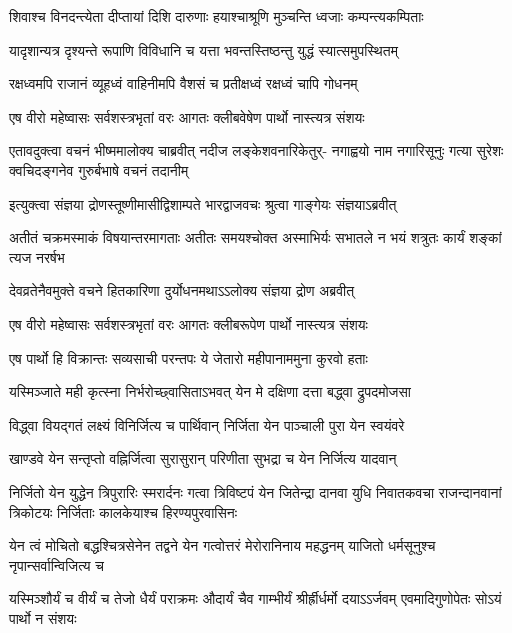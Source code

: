 \twolineshloka
{शिवाश्च विनदन्त्येता दीप्तायां दिशि दारुणाः}
{हयाश्चाश्रूणि मुञ्चन्ति ध्वजाः कम्पन्त्यकम्पिताः}


\twolineshloka
{यादृशान्यत्र दृश्यन्ते रूपाणि विविधानि च}
{यत्ता भवन्तस्तिष्ठन्तु युद्धं स्यात्समुपस्थितम्}


\twolineshloka
{रक्षध्वमपि राजानं व्यूहध्वं वाहिनीमपि}
{वैशसं च प्रतीक्षध्वं रक्षध्वं चापि गोधनम्}


\twolineshloka
{एष वीरो महेष्वासः सर्वशस्त्रभृतां वरः}
{आगतः क्लीबवेषेण पार्थो नास्त्यत्र संशयः}


\onelineshloka
{एतावदुक्त्वा वचनं भीष्ममालोक्य चाब्रवीत्}
\fourlineindentedshloka
{नदीज लङ्केशवनारिकेतुर्-}
{नगाह्वयो नाम नगारिसूनुः}
{गत्या सुरेशः क्वचिदङ्गनेव}
{गुरुर्बभाषे वचनं तदानीम्}



\twolineshloka
{इत्युक्त्वा संज्ञया द्रोणस्तूष्णीमासीद्विशाम्पते}
{भारद्वाजवचः श्रुत्वा गाङ्गेयः संज्ञयाऽब्रवीत्}


\threelineshloka
{अतीतं चक्रमस्माकं विषयान्तरमागताः}
{अतीतः समयश्चोक्त अस्माभिर्यः सभातले}
{न भयं शत्रुतः कार्यं शङ्कां त्यज नरर्षभ}


\twolineshloka
{देवव्रतेनैवमुक्ते वचने हितकारिणा}
{दुर्योधनमथाऽऽलोक्य संज्ञया द्रोण अब्रवीत्}


\twolineshloka
{एष वीरो महेष्वासः सर्वशस्त्रभृतां वरः}
{आगतः क्लीबरूपेण पार्थो नास्त्यत्र संशयः}


\twolineshloka
{एष पार्थो हि विक्रान्तः सव्यसाची परन्तपः}
{ये जेतारो महीपानाममुना कुरवो हताः}


\twolineshloka
{यस्मिञ्जाते मही कृत्स्ना निर्भरोच्छ्वासिताऽभवत्}
{येन मे दक्षिणा दत्ता बद्ध्वा द्रुपदमोजसा}


\twolineshloka
{विद्ध्वा वियद्गतं लक्ष्यं विनिर्जित्य च पार्थिवान्}
{निर्जिता येन पाञ्चाली पुरा येन स्वयंवरे}


\twolineshloka
{खाण्डवे येन सन्तृप्तो वह्निर्जित्वा सुरासुरान्}
{परिणीता सुभद्रा च येन निर्जित्य यादवान्}


\onelineshloka
{निर्जितो येन युद्धेन त्रिपुरारिः स्मरार्दनः}
\threelineshloka
{गत्वा त्रिविष्टपं येन जितेन्द्रा दानवा युधि}
{निवातकवचा राजन्दानवानां त्रिकोटयः}
{निर्जिताः कालकेयाश्च हिरण्यपुरवासिनः}


\onelineshloka
{येन त्वं मोचितो बद्धश्चित्रसेनेन तद्वने}
\twolineshloka
{येन गत्वोत्तरं मेरोरानिनाय महद्धनम्}
{याजितो धर्मसूनुश्च नृपान्सर्वान्विजित्य च}


\threelineshloka
{यस्मिञ्शौर्यं च वीर्यं च तेजो धैर्यं पराक्रमः}
{औदार्यं चैव गाम्भीर्यं श्रीर्ह्रीर्धर्मो दयाऽऽर्जवम्}
{एवमादिगुणोपेतः सोऽयं पार्थो न संशयः}


